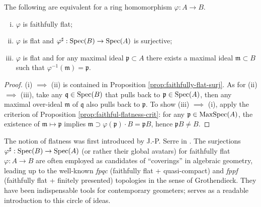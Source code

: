 \begin{theorem}\label{prop:faithfully-flat-criterion}
	The following are equivalent for a ring homomorphism $\varphi: A \to B$.
	\begin{enumerate}[(i)]
		\item $\varphi$ is faithfully flat;
		\item $\varphi$ is flat and $\varphi^\sharp: \operatorname{Spec}(B) \to \operatorname{Spec}(A)$ is surjective;
		\item $\varphi$ is flat and for any maximal ideal $\mathfrak{p} \subset A$ there exists a maximal ideal $\mathfrak{m} \subset B$ such that $\varphi^{-1}(\mathfrak{m}) = \mathfrak{p}$.
	\end{enumerate}
\end{theorem}
\begin{proof}
	(i) $\implies$ (ii) is contained in Proposition \ref{prop:faithfully-flat-surj}. As for (ii) $\implies$ (iii), take any $\mathfrak{q} \in \operatorname{Spec}(B)$ that pulls back to $\mathfrak{p} \in \operatorname{Spec}(A)$, then any maximal over-ideal $\mathfrak{m}$ of $\mathfrak{q}$ also pulls back to $\mathfrak{p}$. To show (iii) $\implies$ (i), apply the criterion of Proposition \ref{prop:faithful-flatness-crit}: for any $\mathfrak{p} \in \operatorname{MaxSpec}(A)$, the existence of $\mathfrak{m} \mapsto \mathfrak{p}$ implies $\mathfrak{m} \supset \varphi(\mathfrak{p}) \cdot B = \mathfrak{p}B$, hence $\mathfrak{p}B \neq B$.
\end{proof}

The notion of flatness was first introduced by J.-P. Serre in \cite{Se55}. The surjections $\varphi^\sharp: \operatorname{Spec}(B) \to \operatorname{Spec}(A)$ (or rather their global avatars) for faithfully flat $\varphi: A \to B$ are often employed as candidates of ``coverings'' in algebraic geometry, leading up to the well-known \emph{fpqc} (faithfully flat + quasi-compact) and \emph{fppf} (faithfully flat + finitely presented) topologies in the sense of Grothendieck. They have been indispensable tools for contemporary geometers; \cite{Vi05} serves as a readable introduction to this circle of ideas.